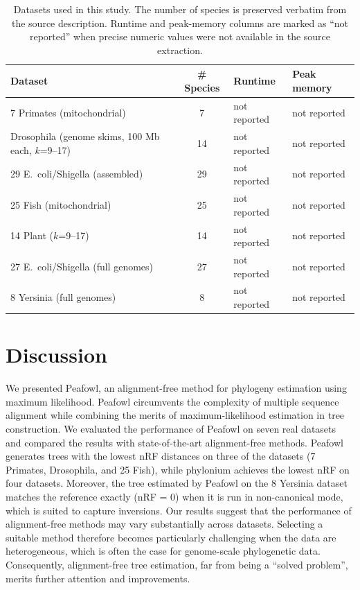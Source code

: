\documentclass[11pt]{article}
\begin{document}
\begin{table}[t]
\centering
\caption{Datasets used in this study. The number of species is preserved verbatim from the source description. Runtime and peak-memory columns are marked as ``not reported'' when precise numeric values were not available in the source extraction.}
\label{tab:runtime}
\begin{tabular}{lcll}
\toprule
Dataset & \# Species & Runtime & Peak memory \\
\midrule
7 Primates (mitochondrial)                  &  7 & not reported & not reported \\
Drosophila (genome skims, 100 Mb each, $k$=9--17)       & 14 & not reported & not reported \\
29 E.~coli/Shigella (assembled)             & 29 & not reported & not reported \\
25 Fish (mitochondrial)                     & 25 & not reported & not reported \\
14 Plant ($k$=9--17)                                 & 14 & not reported & not reported \\
27 E.~coli/Shigella (full genomes)          & 27 & not reported & not reported \\
8 Yersinia (full genomes)                   &  8 & not reported & not reported \\
\bottomrule
\end{tabular}
\end{table}

\section{Discussion}

We presented Peafowl, an alignment-free method for phylogeny estimation using maximum likelihood. Peafowl circumvents the complexity of multiple sequence alignment while combining the merits of maximum-likelihood estimation in tree construction. We evaluated the performance of Peafowl on seven real datasets and compared the results with state-of-the-art alignment-free methods. Peafowl generates trees with the lowest nRF distances on three of the datasets (7 Primates, Drosophila, and 25 Fish), while phylonium achieves the lowest nRF on four datasets. Moreover, the tree estimated by Peafowl on the 8 Yersinia dataset matches the reference exactly (nRF = 0) when it is run in non-canonical mode, which is suited to capture inversions. Our results suggest that the performance of alignment-free methods may vary substantially across datasets. Selecting a suitable method therefore becomes particularly challenging when the data are heterogeneous, which is often the case for genome-scale phylogenetic data. Consequently, alignment-free tree estimation, far from being a ``solved problem'', merits further attention and improvements.
\end{document}
